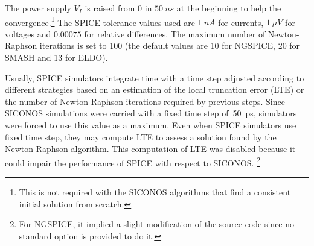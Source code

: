 \documentclass{article}
\begin{document}
\clearpage

The power supply $V_I$ is raised from 0 in $50~ns$ at the beginning to help the convergence.\footnote{This is
not required with the SICONOS algorithms that find a consistent initial solution from scratch.}
The SPICE tolerance values used are $1~nA$ for currents, $1~\mu V$ for voltages and $0.00075$ for relative differences.
The maximum number of Newton-Raphson iterations is set to 100 (the default values are 10 for NGSPICE, 20 for SMASH and
13 for ELDO).

Usually, SPICE simulators integrate time with a time step adjusted according to different strategies based on an estimation
of the local truncation error (LTE) or the number of Newton-Raphson iterations required by previous steps.
Since SICONOS simulations were carried with a fixed time step of~50~ps, simulators were forced to use this value as a maximum.
Even when SPICE simulators use fixed time step, they may compute LTE to assess a solution found by the Newton-Raphson
algorithm. This computation of LTE was disabled because it could impair the performance of SPICE with respect to SICONOS.
\footnote{For NGSPICE, it implied a slight modification of the source code since no standard option is provided to do it.}
\end{document}
